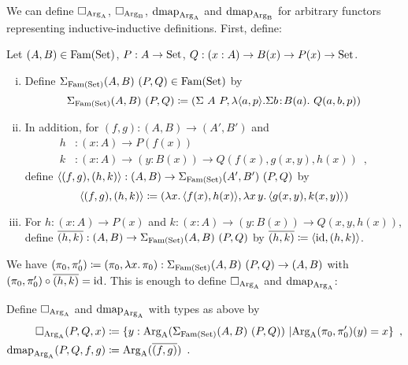 \documentclass[orivec,envcountsame, ,envcountsect]{llncs}
\begin{document}
We can define $\Box_{\text{Arg}_{\text{A}}}$, $\Box_{\text{Arg}_{\text{B}}}$, $\text{dmap}_{\text{Arg}_{\text{A}}}$ and $\text{dmap}_{\text{Arg}_{\text{B}}}$ for arbitrary functors
representing inductive-inductive definitions. First, define:

\begin{definition}
    Let $(A, B) \in \text{Fam}(\text{Set})$, $P : A \to \text{Set}$, $Q : (x : A) \to B(x)
    \to P(x) \to \text{Set}$.
  \begin{enumerate}[(i)]
  \item Define $\Sigma_{\text{Fam}(\text{Set})} (A, B)\ (P, Q) \in \text{Fam}(\text{Set})$ by
 \[
\Sigma_{\text{Fam}(\text{Set})} (A, B)\ (P, Q) \coloneqq (\Sigma\ A\ P, \lambda
    \langle a, p\rangle . \Sigma b\!:\!B(a).\ Q(a, b, p))
 \]
  \item In addition, for $(f, g) : (A, B) \to (A', B')$ and
  \begin{align*}
h &: (x : A) \to P(f(x)) \\
k &: (x : A) \to (y : B(x)) \to Q(f(x), g(x, y), h(x)) \enspace ,
  \end{align*}
define $\langle(f, g), (h, k)\rangle : (A, B) \to \Sigma_{\text{Fam}(\text{Set})} (A', B')\ (P, Q)$ by
\[
\langle(f, g), (h, k)\rangle \coloneqq (\lambda x .\, \langle f(x), h(x)\rangle, \lambda x\,y .\, \langle g(x, y), k(x, y)\rangle)
\]
\item For $h : (x : A) \to P(x)$ and $ k : (x : A) \to (y : B(x)) \to
  Q(x, y, h(x))$, define $\overline{(h, k)} : (A, B) \to \Sigma_{\text{Fam}(\text{Set})} (A, B)\
  (P, Q)$ by $\overline{(h, k)} \coloneqq \langle\text{id}, (h, k)\rangle$.
  \end{enumerate}
\end{definition}
We have $(\pi_0, \pi'_0) \coloneqq (\pi_0, \lambda x .\,
\pi_0) : \Sigma_{\text{Fam}(\text{Set})} (A, B)\ (P, Q) \to (A, B)$ with $(\pi_0, \pi'_0)
\circ \overline{(h, k)} = \text{id}$. This is enough to define $\Box_{\text{Arg}_{\text{A}}}$ and $\text{dmap}_{\text{Arg}_{\text{A}}}$:

\begin{definition}
Define $\Box_{\text{Arg}_{\text{A}}}$ and $\text{dmap}_{\text{Arg}_{\text{A}}}$ with types as above by
\begin{align*}
\BOX_{\ArgA}(P, Q, x) &\coloneqq %
    \{ y : \ArgA(\SigmaFAM (A, B)\ (P, Q))\ | \ArgA(\pi_0, \pi'_0)(y) = x\} \enspace , \\
\dmap_{\ArgA}(P, Q, f, g) &\coloneqq %
    \ArgA(\CwFsect{(f, g)}) \enspace .
\end{align*}
\end{definition}
\end{document}
